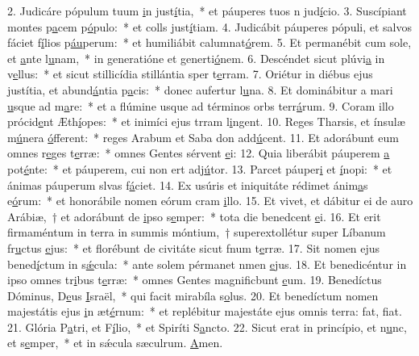2. Judicáre pópulum tuum \uline{i}n just\uline{í}tia,~* et páuperes tuos n jud\uline{í}cio.
3. Suscípiant montes p\uline{a}cem p\uline{ó}pulo:~* et colls just\uline{í}tiam.
4. Judicábit páuperes pópuli, et salvos fáciet f\uline{í}lios p\uline{áu}perum:~* et humiliábit calumnat\uline{ó}rem.
5. Et permanébit cum sole, et \uline{a}nte l\uline{u}nam,~* in generatióne et generti\uline{ó}nem.
6. Descéndet sicut plúvi\uline{a} in v\uline{e}llus:~* et sicut stillicídia stillántia sper t\uline{e}rram.
7. Oriétur in diébus ejus justítia, et abund\uline{á}ntia p\uline{a}cis:~* donec aufertur l\uline{u}na.
8. Et dominábitur a mari \uline{u}sque ad m\uline{a}re:~* et a flúmine usque ad términos orbs terr\uline{á}rum.
9. Coram illo prócid\uline{e}nt Æth\uline{í}opes:~* et inimíci ejus trram l\uline{i}ngent.
10. Reges Tharsis, et ínsulæ m\uline{ú}nera \uline{ó}fferent:~* reges Arabum et Saba don add\uline{ú}cent.
11. Et adorábunt eum omnes r\uline{e}ges t\uline{e}rræ:~* omnes Gentes sérvent \uline{e}i:
12. Quia liberábit páuperem \uline{a} pot\uline{é}nte:~* et páuperem, cui non ert adj\uline{ú}tor.
13. Parcet páuper\uline{i} et \uline{í}nopi:~* et ánimas páuperum slvas f\uline{á}ciet.
14. Ex usúris et iniquitáte rédimet ánim\uline{a}s e\uline{ó}rum:~* et honorábile nomen eórum cram \uline{i}llo.
15. Et vivet, et dábitur ei de auro Arábiæ,~† et adorábunt de \uline{i}pso s\uline{e}mper:~* tota die benedcent \uline{e}i.
16. Et erit firmaméntum in terra in summis móntium,~† superextollétur super Líbanum fr\uline{u}ctus \uline{e}jus:~* et florébunt de civitáte sicut fnum t\uline{e}rræ.
17. Sit nomen ejus bened\uline{í}ctum in s\uline{ǽ}cula:~* ante solem pérmanet nmen \uline{e}jus.
18. Et benedicéntur in ipso omnes tr\uline{i}bus t\uline{e}rræ:~* omnes Gentes magnificbunt \uline{e}um.
19. Benedíctus Dóminus, D\uline{e}us \uline{I}sraël,~* qui facit mirabíla s\uline{o}lus.
20. Et benedíctum nomen majestátis ejus \uline{i}n æt\uline{é}rnum:~* et replébitur majestáte ejus omnis terra: fat, f\uline{i}at.
21. Glória P\uline{a}tri, et F\uline{í}lio,~* et Spiríti S\uline{a}ncto.
22. Sicut erat in princípio, et n\uline{u}nc, et s\uline{e}mper,~* et in sǽcula sæculrum. \uline{A}men.
